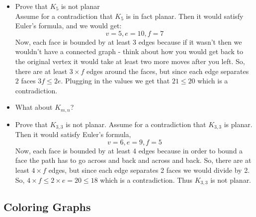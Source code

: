 \documentclass[12pt]{article}
\theoremstyle{plain}
\theoremstyle{definition}
\theoremstyle{remark}
\newcommand{\todayis}[1]{\clearpage{\rhead{\footnotesize #1}}}
\begin{document}
\begin{itemize}
\item Prove that $K_5$ is not planar\\
Assume for a contradiction that $K_5$ is in fact planar. Then it would satisfy Euler's formula, and we would get:
\[v=5, e=10, f=7\]
Now, each face is bounded by at least 3 edges because if it wasn't then we wouldn't have a connected graph - think about how you would get back to the original vertex it would take at least two more moves after you left. So, there are at least $3\times f$ edges around the faces, but since each edge separates $2$ faces $3f\leq 2e$. Plugging in the values we get that $21\leq 20$ which is a contradiction.
\item What about $K_{m,n}$?
\item Prove that $K_{3,3}$ is not planar.
Assume for a contradiction that $K_{3,3}$ is planar. Then it would satisfy Euler's formula,
\[v=6, e=9, f=5\]
Now, each face is bounded by at least 4 edges because in order to bound a face the path has to go across and back and across and back. So, there are at least $4\times f$ edges, but since each edge separates 2 faces we would divide by 2. So, $4\times f \leq 2\times e= 20\leq 18$ which is a contradiction. Thus $K_{3,3}$ is not planar.

\end{itemize}




\todayis{Friday, November 10}

\subsection*{Coloring Graphs}
\end{document}
